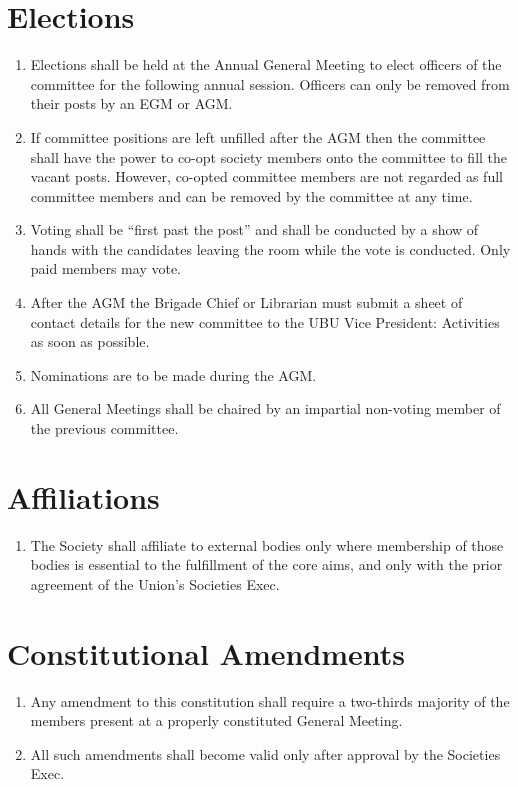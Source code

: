 \documentclass[a4paper,10pt]{article}
\begin{document}
\section{Elections}
\begin{enumerate}
  \item Elections shall be held at the Annual General Meeting to elect officers of the committee for the following annual session. Officers can only be removed from their posts by an EGM or AGM.
  \item If committee positions are left unfilled after the AGM then the committee shall have the power to co-opt society members onto the committee to fill the vacant posts. However, co-opted committee members are not regarded as full committee members and can be removed by the committee at any time.
  \item Voting shall be “first past the post” and shall be conducted by a show of hands with the candidates leaving the room while the vote is conducted. Only paid members may vote.
  \item After the AGM the Brigade Chief or Librarian must submit a sheet of contact details for the new committee to the UBU Vice President: Activities as soon as possible.
  \item Nominations are to be made during the AGM.
  \item All General Meetings shall be chaired by an impartial non-voting member of the previous committee.
\end{enumerate}

\section{Affiliations}
\begin{enumerate}
  \item The Society shall affiliate to external bodies only where membership of those bodies is essential to the fulfillment of the core aims, and only with the prior agreement of the Union's Societies Exec.
\end{enumerate}

\section{Constitutional Amendments}
\begin{enumerate}
  \item Any amendment to this constitution shall require a two-thirds majority of the members present at a properly constituted General Meeting.
  \item All such amendments shall become valid only after approval by the Societies Exec.
\end{enumerate}
\end{document}
